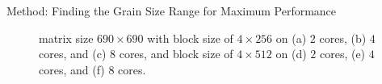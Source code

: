 \documentclass[10pt]{beamer}
\begin{document}
\begin{frame}{Method: Finding the Grain Size Range for Maximum Performance}
\begin{outline}
\begin{figure}[H]
	\caption{matrix size $690\times690$ with block size of $4\times256$ on (a) $2$ cores, (b) $4$ cores, and (c) $8$ cores, and block size of $4\times512$ on (d) $2$ cores, (e) $4$ cores, and (f) $8$ cores. }	
	\label{fig14}
\end{figure}
\end{outline}
\end{frame}
\end{document}
